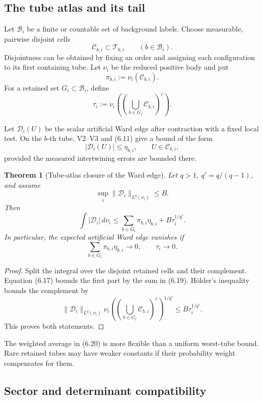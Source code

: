 \documentclass[11pt]{article}
\newtheorem{theorem}{Theorem}[section]
\begin{document}
\subsection{The tube atlas and its tail}

Let \(\mathcal B_i\) be a finite or countable set of background labels.
Choose measurable, pairwise disjoint cells
\[
 \mathcal C_{b,i}\subset\mathcal T_{b,i}
 \qquad (b\in\mathcal B_i).
 \tag{6.14}
\]
Disjointness can be obtained by fixing an order and assigning each
configuration to its first containing tube.  Let \(\nu_i\) be the reduced
positive body and put
\[
 \pi_{b,i}:=\nu_i(\mathcal C_{b,i}).
 \tag{6.15}
\]
For a retained set \(G_i\subset\mathcal B_i\), define
\[
 \tau_i:=
 \nu_i\left(
 \left(\bigcup_{b\in G_i}\mathcal C_{b,i}\right)^c
 \right).
 \tag{6.16}
\]

Let \(\mathcal D_i(U)\) be the scalar artificial Ward edge after contraction
with a fixed local test.  On the \(b\)-th tube, V2--V3 and (6.11) give a
bound of the form
\[
 |\mathcal D_i(U)|\leq\eta_{b,i},
 \qquad U\in\mathcal C_{b,i},
 \tag{6.17}
\]
provided the measured intertwining errors are bounded there.

\begin{theorem}[Tube-atlas closure of the Ward edge]
\label{thm:v11v6-atlas-closure}
Let \(q>1\), \(q'=q/(q-1)\), and assume
\[
 \sup_i\|\mathcal D_i\|_{L^q(\nu_i)}\leq B.
 \tag{6.18}
\]
Then
\[
 \int|\mathcal D_i|\,d\nu_i
 \leq
 \sum_{b\in G_i}\pi_{b,i}\eta_{b,i}
 +B\tau_i^{1/q'}.
 \tag{6.19}
\]
In particular, the expected artificial Ward edge vanishes if
\[
 \sum_{b\in G_i}\pi_{b,i}\eta_{b,i}\longrightarrow0,
 \qquad
 \tau_i\longrightarrow0.
 \tag{6.20}
\]
\end{theorem}

\begin{proof}
Split the integral over the disjoint retained cells and their complement.
Equation (6.17) bounds the first part by the sum in (6.19).
H\"older's inequality bounds the complement by
\[
 \|\mathcal D_i\|_{L^q(\nu_i)}
 \nu_i\left(
 \left(\bigcup_{b\in G_i}\mathcal C_{b,i}\right)^c
 \right)^{1/q'}
 \leq B\tau_i^{1/q'}.
\]
This proves both statements.
\end{proof}

The weighted average in (6.20) is more flexible than a uniform worst-tube
bound.  Rare retained tubes may have weaker constants if their probability
weight compensates for them.

\subsection{Sector and determinant compatibility}
\end{document}
